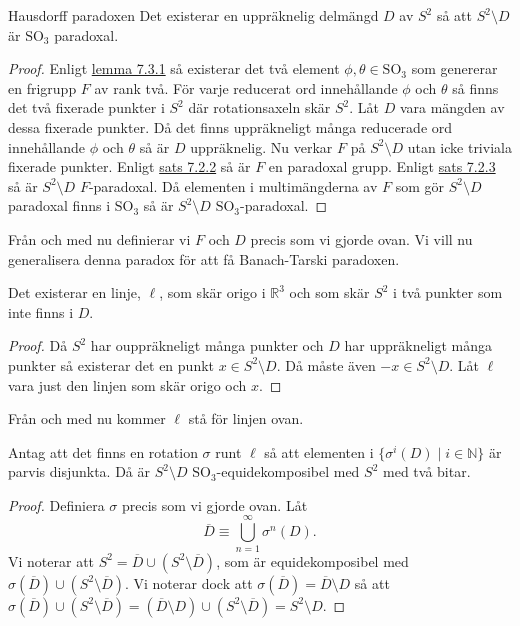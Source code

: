 \documentclass{article}
\theoremstyle{definition}
\begin{document}
\begin{mytheo}{Hausdorff paradoxen}{}
  Det existerar en uppräknelig delmängd $D$ av $S^2$ så att $S^2 \setminus D$ är $\text{SO}_3$ paradoxal.
\end{mytheo}

\begin{proof}
  Enligt \hyperlink{lemma8.3.1}{lemma 7.3.1} så existerar det två element $\phi, \theta \in \text{SO}_3$ som genererar en frigrupp $F$
  av rank två. För varje reducerat ord innehållande $\phi$ och $\theta$ så finns det två fixerade punkter i $S^2$ där rotationsaxeln skär $S^2$. 
  Låt $D$ vara mängden av dessa fixerade punkter. Då det finns uppräkneligt många reducerade ord innehållande $\phi$ och $\theta$ så är $D$ uppräknelig. 
  Nu verkar $F$ på $S^2 \setminus D$ utan icke triviala fixerade punkter. Enligt \hyperlink{sats8.2.2}{sats 7.2.2} så är $F$ en paradoxal grupp.
  Enligt \hyperlink{sats8.3.2}{sats 7.2.3} så är $S^2 \setminus D$ $F$-paradoxal. Då elementen i multimängderna av $F$ som gör 
  $S^2 \setminus D$ paradoxal finns i $\text{SO}_3$ så är $S^2 \setminus D$ $\text{SO}_3$-paradoxal.
\end{proof}

Från och med nu definierar vi $F$ och $D$ precis som vi gjorde ovan. Vi vill nu generalisera denna paradox för att få Banach-Tarski paradoxen. 

\begin{mylemma}{}{}
  Det existerar en linje, $\ell$, som skär origo i $\mathbb{R}^3$ och som skär $S^2$ i två punkter som inte finns i $D$.
\end{mylemma}

\begin{proof}
  Då $S^2$ har ouppräkneligt många punkter och $D$ har uppräkneligt många punkter så existerar det en punkt $x \in S^2 \setminus D$.
  Då måste även $-x \in S^2 \setminus D$. Låt $\ell$ vara just den linjen som skär origo och $x$. 
\end{proof}

Från och med nu kommer $\ell$ stå för linjen ovan.

\hypertarget{sats8.2.3}{}
\begin{mytheo}{}{}
  Antag att det finns en rotation $\sigma$ runt $\ell$ så att elementen i $\{\sigma^i(D) \; | \; i \in \mathbb{N}\}$ är parvis disjunkta. 
  Då är $S^2 \setminus D$ $\text{SO}_3$-equidekomposibel med $S^2$ med två bitar.
\end{mytheo}

\begin{proof}
  Definiera $\sigma$ precis som vi gjorde ovan. Låt 
  \[\overline{D} \equiv \bigcup_{n = 1}^\infty \sigma^n(D).\]
  Vi noterar att $S^2 = \overline{D} \cup (S^2 \setminus \overline{D})$, som är equidekomposibel med 
  $\sigma(\overline{D}) \cup (S^2 \setminus \overline{D})$. Vi noterar dock att $\sigma(\overline{D}) = \overline{D} \setminus D$ så att 
  $\sigma(\overline{D}) \cup (S^2 \setminus \overline{D}) = (\overline{D} \setminus D) \cup (S^2 \setminus \overline{D}) = S^2 \setminus D$.
\end{proof}
\end{document}

